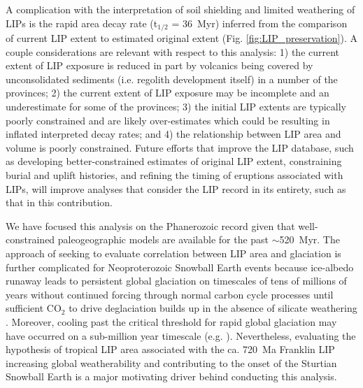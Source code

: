 \documentclass[11pt,letterpaper]{article}
\begin{document}
A complication with the interpretation of soil shielding and limited weathering of LIPs is the rapid area decay rate (t$_{1/2}$ = 36~Myr) inferred from the comparison of current LIP extent to estimated original extent (Fig. \ref{fig:LIP_preservation}). A couple considerations are relevant with respect to this analysis: 1) the current extent of LIP exposure is reduced in part by volcanics being covered by unconsolidated sediments (i.e. regolith development itself) in a number of the provinces; 2) the current extent of LIP exposure may be incomplete and an underestimate for some of the provinces; 3) the initial LIP extents are typically poorly constrained and are likely over-estimates which could be resulting in inflated interpreted decay rates; and 4) the relationship between LIP area and volume is poorly constrained. Future efforts that improve the LIP database, such as developing better-constrained estimates of original LIP extent, constraining burial and uplift histories, and refining the timing of eruptions associated with LIPs, will improve analyses that consider the LIP record in its entirety, such as that in this contribution.

We have focused this analysis on the Phanerozoic record given that well-constrained paleogeographic models are available for the past $\sim$520~Myr. The approach of seeking to evaluate correlation between LIP area and glaciation is further complicated for Neoproterozoic Snowball Earth events because ice-albedo runaway leads to persistent global glaciation on timescales of tens of millions of years without continued forcing through normal carbon cycle processes until sufficient CO$_2$ to drive deglaciation builds up in the absence of silicate weathering \citep{Hoffman2017a}. Moreover, cooling past the critical threshold for rapid global glaciation may have occurred on a sub-million year timescale (e.g. \citealp{Macdonald2017a}). Nevertheless, evaluating the hypothesis of tropical LIP area associated with the ca. 720~Ma Franklin LIP increasing global weatherability and contributing to the onset of the Sturtian Snowball Earth is a major motivating driver behind conducting this analysis.
\end{document}
